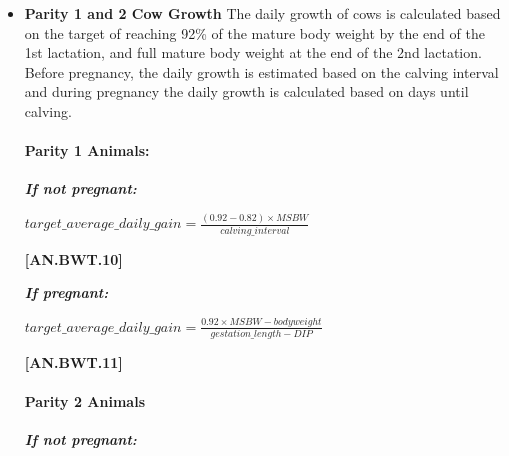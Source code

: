 \documentclass{article}
\begin{document}
\begin{refsection}
\begin{itemize}
    {\raggedleft \textbf{[AN.BWT.9]}\par}
    
    \item \textbf{Parity 1 and 2 Cow Growth} The daily growth of cows is calculated based on the target of reaching 92\% of the mature body weight by the end of the 1st lactation, and full mature body weight at the end of the 2nd lactation. Before pregnancy, the daily growth is estimated based on the calving interval and during pregnancy the daily growth is calculated based on days until calving. 
    \vspace{0.5cm}
    
    \paragraph{Parity 1 Animals:}
    \vspace{0.25cm}
    
    \textbf{\textit{If not pregnant:}}
    \vspace{0.5cm}
    
\begin{center}
    \(target\_average\_daily\_gain = \frac{(0.92-0.82) × MSBW}{calving\_interval}\)
\end{center}
    \vspace{0.5cm}
    
    {\raggedleft \textbf{[AN.BWT.10]}\par}
    \vspace{0.5cm}
    
    \textbf{\textit{If pregnant:}}
    \vspace{0.5cm}
    
\begin{center}
    \(target\_average\_daily\_gain = \frac{0.92 × MSBW - bodyweight}{gestation\_length - DIP}\)
\end{center}
    \vspace{0.5cm}
    
    {\raggedleft \textbf{[AN.BWT.11]}\par}
    \vspace{0.5cm}

    \paragraph{Parity 2 Animals}
    \vspace{0.5cm}

    
    \textbf{\textit{If not pregnant:}}
    \vspace{0.5cm}
    

\end{itemize}
\end{refsection}
\end{document}
